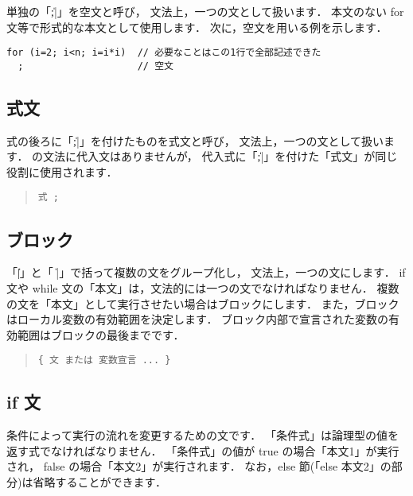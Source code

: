 単独の「\|;|」を空文と呼び，
文法上，一つの文として扱います．
本文のない for 文等で形式的な本文として使用します．
次に，空文を用いる例を示します．

\begin{mylist}
\begin{verbatim}
for (i=2; i<n; i=i*i)  // 必要なことはこの1行で全部記述できた
  ;                    // 空文
\end{verbatim}
\end{mylist}

\subsection{式文}

式の後ろに「\|;|」を付けたものを式文と呼び，
文法上，一つの文として扱います．
\cmml の文法に代入文はありませんが，
代入式に「\|;|」を付けた「式文」が同じ役割に使用されます．

\begin{quote}
\begin{verbatim}
式 ;
\end{verbatim}
\end{quote}

\subsection{ブロック}

「\|{|」と「 \|}|」で括って複数の文をグループ化し，
文法上，一つの文にします．
if 文や while 文の「本文」は，文法的には一つの文でなければなりません．
複数の文を「本文」として実行させたい場合はブロックにします．
また，ブロックはローカル変数の有効範囲を決定します．
ブロック内部で宣言された変数の有効範囲はブロックの最後までです．

\begin{quote}
\begin{verbatim}
{ 文 または 変数宣言 ... }
\end{verbatim}
\end{quote}

\subsection{if 文}

条件によって実行の流れを変更するための文です．
「条件式」は論理型の値を返す式でなければなりません．
「条件式」の値が true の場合「本文1」が実行され，
false の場合「本文2」が実行されます．
なお，else 節(「else 本文2」の部分)は省略することができます．

